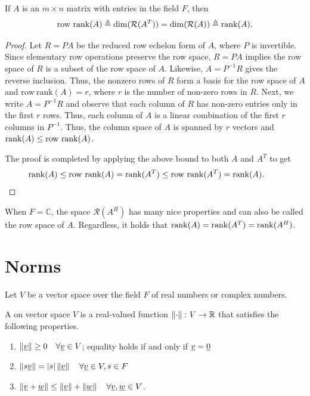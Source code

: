 \begin{theorem}
If $A$ is an $m \times n$ matrix with entries in the field $F$, then
\begin{equation*}
\mathrm{row~rank} (A) \triangleq \dim( \mathcal{R}(A^T)) =  \dim( \mathcal{R}(A)) \triangleq \mathrm{rank} (A).
\end{equation*}
\end{theorem}
\begin{proof}
Let $R=PA$ be the reduced row echelon form of $A$, where $P$ is invertible.
Since elementary row operations preserve the row space, $R=PA$ implies the row space of $R$ is a subset of the row space of $A$.
Likewise, $A=P^{-1}R$ gives the reverse inclusion. 
Thus, the nonzero rows of $R$ form a basis for the row space of $A$ and $\mathrm{row~rank} (A) = r$, where $r$ is the number of non-zero rows in $R$.
Next, we write $A=P^{-1}R$ and observe that each column of $R$ has non-zero entries only in the first $r$ rows.
Thus, each column of $A$ is a linear combination of the first $r$ columns in $P^{-1}$.
Thus, the column space of $A$ is spanned by $r$ vectors and $\mathrm{rank} (A) \leq \mathrm{row~rank} (A)$.

The proof is completed by applying the above bound to both $A$ and $A^T$ to get
\[ \mathrm{rank} (A) \leq \mathrm{row~rank} (A) = \mathrm{rank} (A^T) \leq \mathrm{row~rank} (A^T) = \mathrm{rank} (A).   \tag*{\qedhere} \]
\end{proof}
When $F=\mathbb{C}$, the space $\mathcal{R}(A^H)$ has many nice properties and can also be called the row space of $A$.
Regardless, it holds that $\mathrm{rank}(A) = \mathrm{rank}(A^T) = \mathrm{rank}(A^H)$.



\section{Norms}

Let $V$ be a vector space over the field $F$ of real numbers or complex numbers.

\begin{definition}
A  on vector space $V$ is a real-valued function $\left\| \cdot \right\| \colon V \rightarrow \mathbb{R}$ that satisfies the following properties.
\begin{enumerate}
\item $\left\| \underline{v} \right\| \geq 0 \quad \forall \underline{v} \in V$;
equality holds if and only if $\underline{v} = \underline{0}$
\item $\left\| s \underline{v} \right\| = |s| \left\| \underline{v} \right\| \quad \forall \underline{v} \in V, s \in F$
\item $\left\| \underline{v} + \underline{w} \right\| \leq
\left\| \underline{v} \right\| + \left\| \underline{w} \right\| \quad \forall \underline{v}, \underline{w} \in V$.
\end{enumerate}
\end{definition}

